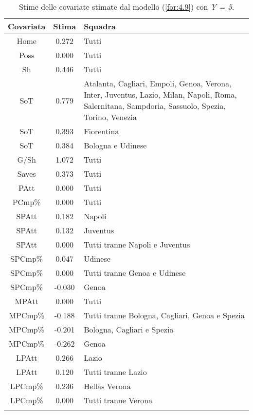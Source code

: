 \begin{table}[!htbp]
	
	\renewcommand{\arraystretch}{1.7}
	\centering
	\begin{tabular}{ccp{10cm}}
		\hline	
		
		\textbf{Covariata} & \textbf{Stima} & \textbf{Squadra} \\	
		\hline
		Home & 0.272 & Tutti\\
		Poss & 0.000 & Tutti\\
		Sh & 0.446 & Tutti \\
		SoT & 0.779 & Atalanta, Cagliari, Empoli, Genoa, Verona, Inter, Juventus, Lazio, Milan, Napoli, Roma, Salernitana, Sampdoria, Sassuolo, Spezia, Torino, Venezia\\
		SoT & 0.393 & Fiorentina\\
		SoT & 0.384 & Bologna e Udinese \\
		G/Sh & 1.072 & Tutti \\
		Saves & 0.373 & Tutti \\
		PAtt & 0.000 & Tutti \\
		PCmp\% & 0.000 & Tutti \\
		SPAtt & 0.182 & Napoli \\
		SPAtt & 0.132 & Juventus \\
		SPAtt & 0.000 & Tutti tranne Napoli e Juventus \\
		SPCmp\% & 0.047 & Udinese \\	
		SPCmp\% & 0.000 & Tutti tranne Genoa e Udinese\\ 
		SPCmp\% & -0.030 & Genoa \\	
		MPAtt & 0.000 & Tutti \\ 
		MPCmp\% & -0.188 & Tutti tranne Bologna, Cagliari, Genoa e Spezia \\
		MPCmp\% & -0.201 & Bologna, Cagliari e Spezia \\
		MPCmp\% & -0.262 & Genoa \\
		LPAtt & 0.266 & Lazio \\
		LPAtt & 0.120 & Tutti tranne Lazio \\
		LPCmp\% & 0.236 & Hellas Verona \\
		LPCmp\% & 0.000 & Tutti tranne  Verona \\
		
		\hline
		& &  \\
		
	\end{tabular} \hbox{}
	\caption{Stime delle covariate stimate dal modello (\ref{for:4.9}) con \emph{Y = 5}.} \label{tab:BTCL25} 
	
\end{table}
